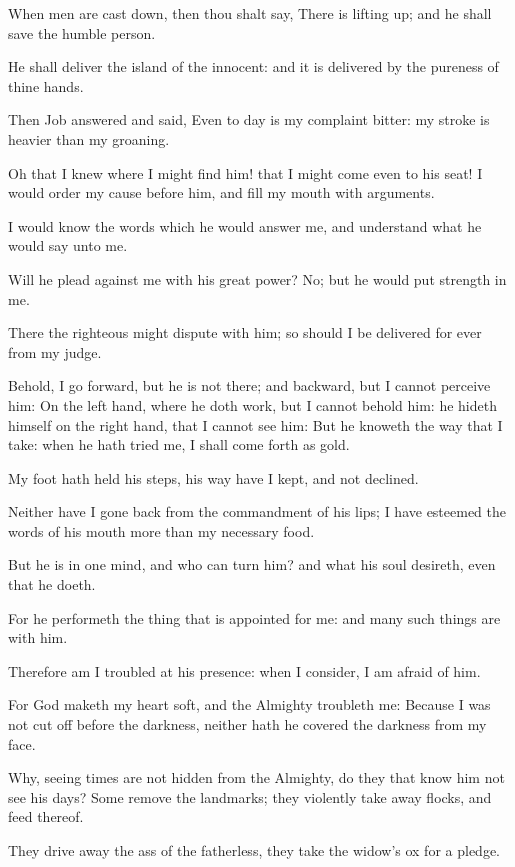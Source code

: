 \Verse When men are cast down, then thou shalt say, There is lifting up; and he shall save the humble person.

\Verse He shall deliver the island of the innocent: and it is delivered by the pureness of thine hands.


\Chapter
\Verse Then Job answered and said, \Verse Even to day is my complaint bitter: my stroke is heavier than my groaning.

\Verse Oh that I knew where I might find him! that I might come even to his seat!  \Verse I would order my cause before him, and fill my mouth with arguments.

\Verse I would know the words which he would answer me, and understand what he would say unto me.

\Verse Will he plead against me with his great power? No; but he would put strength in me.

\Verse There the righteous might dispute with him; so should I be delivered for ever from my judge.

\Verse Behold, I go forward, but he is not there; and backward, but I cannot perceive him: \Verse On the left hand, where he doth work, but I cannot behold him: he hideth himself on the right hand, that I cannot see him: \Verse But he knoweth the way that I take: when he hath tried me, I shall come forth as gold.

\Verse My foot hath held his steps, his way have I kept, and not declined.

\Verse Neither have I gone back from the commandment of his lips; I have esteemed the words of his mouth more than my necessary food.

\Verse But he is in one mind, and who can turn him? and what his soul desireth, even that he doeth.

\Verse For he performeth the thing that is appointed for me: and many such things are with him.

\Verse Therefore am I troubled at his presence: when I consider, I am afraid of him.

\Verse For God maketh my heart soft, and the Almighty troubleth me: \Verse Because I was not cut off before the darkness, neither hath he covered the darkness from my face.


\Chapter
\Verse Why, seeing times are not hidden from the Almighty, do they that know him not see his days?  \Verse Some remove the landmarks; they violently take away flocks, and feed thereof.

\Verse They drive away the ass of the fatherless, they take the widow's ox for a pledge.

